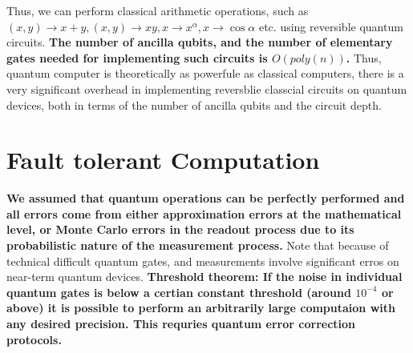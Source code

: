\documentclass[12pt, oneside]{book}
\theoremstyle{definition}
\theoremstyle{definition}
\theoremstyle{remark}
\begin{document}
Thus, we can perform classical arithmetic operations, such as $(x,y)\rightarrow x+y,(x,y)\rightarrow xy,x \rightarrow x^{\alpha}, x\rightarrow \cos\alpha $ etc.
using reversible quantum circuits. \textbf{The number of ancilla qubits, and the number of elementary gates needed for implementing such circuits is $O(poly(n))$.}
Thus, quantum computer is theoretically as powerfule as classical computers, there is a very significant overhead in implementing reversblie classcial circuits on quantum devices, both in terms of the number
of ancilla qubits and the circuit depth.
 
\section{Fault tolerant Computation}
\textbf{We assumed that quantum operations can be perfectly performed and all errors come from either approximation errors at the mathematical level,
or Monte Carlo errors in the readout process due to its probabilistic nature of the measurement process.}
Note that because of technical difficult quantum gates, and measurements involve significant erros on near-term quantum devices.
\textbf{Threshold theorem: If the noise in individual quantum gates is below a certian constant threshold (around $10^{-4}$ or above) it is possible to perform an arbitrarily
large computaion with any desired precision. This requries quantum error correction protocols.}
\end{document}
